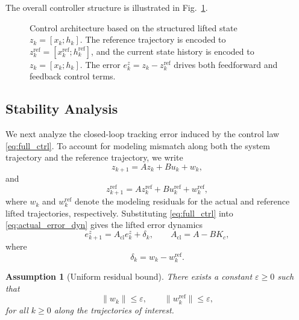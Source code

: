 \documentclass[journal]{IEEEtran}
\newtheorem{assumption}{Assumption}
\begin{document}
The overall controller structure is illustrated in Fig.~\ref{fig:control_architecture}.

\begin{figure}[!t]
    \centering
    \caption{Control architecture based on the structured lifted state $z_k=[x_k;h_k]$. The reference trajectory is encoded to $z_k^{\mathrm{ref}}=[x_k^{\mathrm{ref}};h_k^{\mathrm{ref}}]$, and the current state history is encoded to $z_k=[x_k;h_k]$. The error $e_k^z = z_k - z_k^{\mathrm{ref}}$ drives both feedforward and feedback control terms.}
    \label{fig:control_architecture}
\end{figure}

\subsection{Stability Analysis}
\label{subsec:stability}

We next analyze the closed-loop tracking error induced by the control law \eqref{eq:full_ctrl}. To account for modeling mismatch along both the system trajectory and the reference trajectory, we write
\begin{equation}
    z_{k+1} = A z_k + B u_k + w_k,
    \label{eq:actual_error_dyn}
\end{equation}
and
\begin{equation}
    z_{k+1}^{\mathrm{ref}}
    =
    A z_k^{\mathrm{ref}} + B u_k^{\mathrm{ref}} + w_k^{\mathrm{ref}},
    \label{eq:ref_error_dyn}
\end{equation}
where $w_k$ and $w_k^{\mathrm{ref}}$ denote the modeling residuals for the actual and reference lifted trajectories, respectively. Substituting \eqref{eq:full_ctrl} into \eqref{eq:actual_error_dyn} gives the lifted error dynamics
\begin{equation}
    e_{k+1}^z
    =
    A_{\mathrm{cl}} e_k^z + \delta_k,
    \qquad
    A_{\mathrm{cl}} = A - B K_c,
    \label{eq:cl_error_dyn}
\end{equation}
where
\begin{equation}
    \delta_k = w_k - w_k^{\mathrm{ref}}.
    \label{eq:delta_def}
\end{equation}

\begin{assumption}[Uniform residual bound]
\label{assump:bound}
There exists a constant $\varepsilon \geq 0$ such that
\begin{equation}
    \|w_k\| \leq \varepsilon,
    \qquad
    \|w_k^{\mathrm{ref}}\| \leq \varepsilon,
    \label{eq:residual_bound}
\end{equation}
for all $k \geq 0$ along the trajectories of interest.
\end{assumption}
\end{document}
